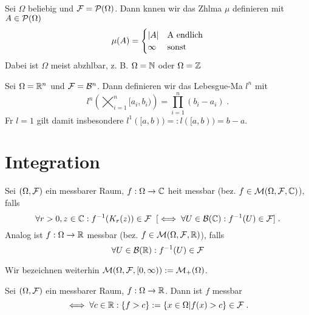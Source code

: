 \begin{ex}
	Sei \(\Omega\) beliebig und \(\mathcal{F} = \mathcal{P}(\Omega)\). Dann k\os nnen wir das Z\as hlma\s{}  $\mu$ definieren mit \(A \in \mathcal{P}(\Omega)\)
	\[\mu(A) = \begin{cases}\ab{A} & $A$ \text{ endlich}\\ \infty & \text{sonst}\end{cases} \] 
	Dabei ist $\Omega$ meist abz\as hlbar, z. B. \(\Omega = \mathbb{N}\) oder \(\Omega = \mathbb{Z}\)
\end{ex}

\begin{ex}
	Sei \(\Omega = \mathbb{R}^n\) und \(\mathcal{F} = \mathcal{B} ^n\). Dann definieren wir das Lebesgue-Ma\s{} $l^n$ mit 
	\[l^n\left(\bigtimes_{i=1}^n [a_i, b_i)\right) = \prod_{i=1}^n (b_i -a_i)\;.\]
	F\us r $l=1$ gilt damit insbesondere \(l^1([a,b)) =: l([a,b)) = b-a\).
\end{ex}

\section{Integration}
\begin{definition}
	Sei \((\Omega, \mathcal{F})\) ein messbarer Raum, \(f:\Omega\to \mathbb{C}\) hei\s t messbar (bez. \(f\in \mathcal{M} (\Omega, \mathcal{F}, \mathbb{C})\)), falls
	\[\forall r > 0, z \in \mathbb{C}: f^{-1}(K_r(z)) \in \mathcal{F} \;\;[\iff \forall U \in \mathcal{B}(\mathbb{C}) : f^{-1}(U) \in \mathcal{F}]\;.\]
	Analog ist \(f:\Omega \to \mathbb{R}\) messbar (bez. \(f \in \mathcal{M} (\Omega, \mathcal{F}, \mathbb{R})\)), falls
	\[\forall U \in \mathcal{B}(\mathbb{R}): f^{-1}(U) \in \mathcal{F}\]
\end{definition}
\begin{rem}
	Wir bezeichnen weiterhin \(\mathcal{M}(\Omega, \mathcal{F}, [0,\infty)) := \mathcal{M}_+(\Omega)\).
\end{rem}
\begin{rem}
	Sei \((\Omega, \mathcal{F})\) ein messbarer Raum, \(f: \Omega \to \mathbb{R}\). Dann ist $f$ messbar 
	\[\iff \forall c\in \mathbb{R}: \left\{f > c\right\} := \left\{x\in \Omega \vert f(x) > c\right\} \in \mathcal{F}\;.\]
\end{rem}

